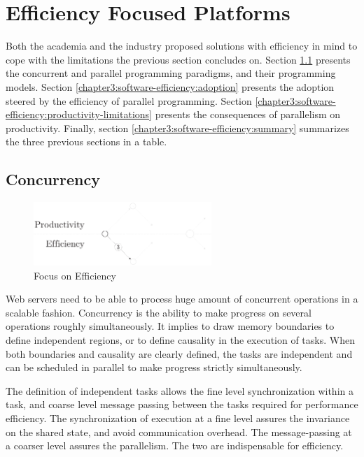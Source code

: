\section{Efficiency Focused Platforms} \label{chapter3:software-efficiency}

Both the academia and the industry proposed solutions with efficiency in mind to cope with the limitations the previous section concludes on.
Section \ref{chapter3:software-efficiency:concurrency} presents the concurrent and parallel programming paradigms, and their programming models. %
Section \ref{chapter3:software-efficiency:adoption} presents the adoption steered by the efficiency of parallel programming.
Section \ref{chapter3:software-efficiency:productivity-limitations} presents the consequences of parallelism on productivity.
Finally, section \ref{chapter3:software-efficiency:summary} summarizes the three previous sections in a table.

\subsection{Concurrency} \label{chapter3:software-efficiency:concurrency}

\begin{figure}[!h]
\begin{center}
\includegraphics[width=0.6\textwidth]{../ressources/state-of-the-art-3.pdf}
\end{center}
\caption{Focus on Efficiency}
\label{fig:state-of-the-art-3}
\end{figure}

Web servers need to be able to process huge amount of concurrent operations in a scalable fashion.
Concurrency is the ability to make progress on several operations roughly simultaneously.
It implies to draw memory boundaries to define independent regions, or to define causality in the execution of tasks.
When both boundaries and causality are clearly defined, the tasks are independent and can be scheduled in parallel to make progress strictly simultaneously.

The definition of independent tasks allows the fine level synchronization within a task, and coarse level message passing between the tasks required for performance efficiency.
The synchronization of execution at a fine level assures the invariance on the shared state, and avoid communication overhead.
The message-passing at a coarser level assures the parallelism.
The two are indispensable for efficiency.

